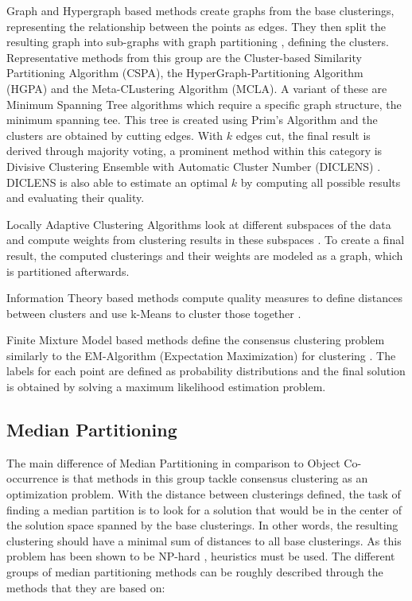 \documentclass[
	a4paper,
	english,
	twoside,
	openright,               
	11pt                            
	]{report}
\begin{document}
Graph and Hypergraph based methods create graphs from the base clusterings, representing the relationship between the points as edges. They then split the resulting graph into sub-graphs with graph partitioning \cite{Strehl:2003:CEK:944919.944935}, defining the clusters. Representative methods from this group are the Cluster-based Similarity Partitioning Algorithm (CSPA), the HyperGraph-Partitioning Algorithm (HGPA) and the Meta-CLustering Algorithm (MCLA). A variant of these are Minimum Spanning Tree algorithms which require a specific graph structure, the minimum spanning tee. This tree is created using Prim's Algorithm \cite[p.~276]{10.1007/978-3-540-85033-5_27} and the clusters are obtained by cutting edges. With $k$ edges cut, the final result is derived through majority voting, a prominent method within this category is Divisive Clustering Ensemble with Automatic Cluster Number (DICLENS) \cite{6035671}. DICLENS is also able to estimate an optimal $k$ by computing all possible results and evaluating their quality.

Locally Adaptive Clustering Algorithms look at different subspaces of the data and compute weights from clustering results in these subspaces \cite{Domeniconi2007}. To create a final result, the computed clusterings and their weights are modeled as a graph, which is partitioned afterwards.

Information Theory based methods compute quality measures to define distances between clusters and use k-Means to cluster those together \cite[p.~353]{survey1}.

Finite Mixture Model based methods define the consensus clustering problem similarly to the EM-Algorithm (Expectation Maximization) for clustering \cite{Goder2008ConsensusCA,Topchy2004AMM}. The labels for each point are defined as  probability distributions and the final solution is obtained by solving a maximum likelihood estimation problem.

\subsection{Median Partitioning}
The main difference of Median Partitioning in comparison to Object Co-occurrence is that methods in this group tackle consensus clustering as an optimization problem. With the distance between clusterings defined, the task of finding a median partition is to look for a solution that would be in the center of the solution space spanned by the base clusterings. In other words, the resulting clustering should have a minimal sum of distances to all base clusterings. As this problem has been shown to be NP-hard \cite{np_median_partition}, heuristics must be used. The different groups of median partitioning methods can be roughly described through the methods that they are based on:
\end{document}
